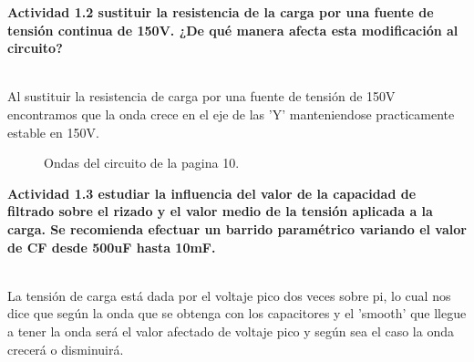 ﻿\documentclass[letterpaper]{article}
\begin{document}
 \begin{large}

\textbf{Actividad 1.2 sustituir la resistencia de la carga por una fuente
de tensión continua de 150V. ¿De qué manera afecta esta modificación
al circuito?}\end{large}\\
Al sustituir la resistencia de carga por una fuente de tensión de 150V encontramos que la onda crece en el eje de las 'Y' manteniendose practicamente estable en 150V.\\
\begin{figure}[htbp]
    \centering
    \caption{Ondas del circuito de la pagina 10.}
    \label{fig:my_labeeel}
\end{figure}
 \begin{large}

\textbf{Actividad 1.3 estudiar la influencia del valor de la capacidad de
filtrado sobre el rizado y el valor medio de la tensión aplicada a
la carga. Se recomienda efectuar un barrido paramétrico variando el
valor de CF desde 500uF hasta 10mF.} \end{large}\\
La tensión de carga está dada por el voltaje pico dos veces sobre pi, lo cual nos dice que según la onda que se obtenga con los capacitores y el 'smooth' que llegue a tener la onda será el valor afectado de voltaje pico y según sea el caso la onda crecerá o disminuirá.\\
\end{document}
